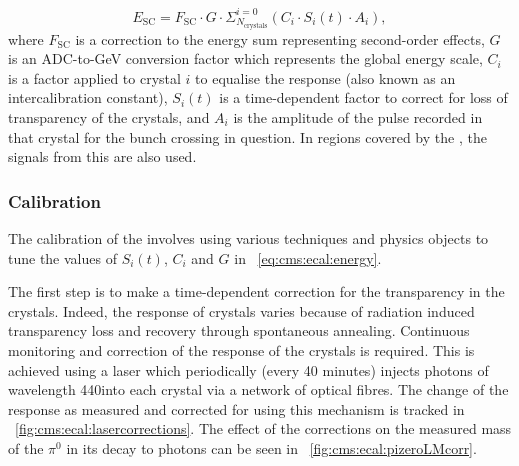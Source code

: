 \begin{equation} 
\label{eq:cms:ecal:energy}
E_{\text{SC}} = F_{\text{SC}} \cdot G \cdot \Sigma^{i=0}_{N_\text{crystals}} ( C_{i} \cdot S_{i}(t) \cdot A_{i}) ,
\end{equation}
where $F_{\text{SC}}$ is a correction to the \SC energy sum representing second-order effects, $G$ is an ADC-to-GeV conversion factor which represents the global energy scale, $C_{i}$ is a factor applied to crystal $i$ to equalise the response (also known as an intercalibration constant), $S_{i}(t)$ is a time-dependent factor to correct for loss of transparency of the crystals, and $A_{i}$ is the amplitude of the pulse recorded in that crystal for the bunch crossing in question. In regions covered by the \ES, the signals from this \subdetector are also used.~\cite{cmsEcalCalibration}


\subsubsection{Calibration}
\label{sec:cms:ecal:calibration}

The calibration of the \ECAL involves using various techniques and physics objects to tune the values of $S_{i}(t)$, $C_{i}$ and $G$ in \Eq~\ref{eq:cms:ecal:energy}. 

The first step is to make a time-dependent correction for the transparency in the crystals. Indeed, the response of \ECAL crystals varies because of radiation induced transparency loss and recovery through spontaneous annealing. Continuous monitoring and correction of the response of the crystals is required. This is achieved using a laser which periodically (every 40 minutes) injects photons of wavelength 440\nm into each crystal via a network of optical fibres. The change of the response as measured and corrected for using this mechanism is tracked in \Fig~\ref{fig:cms:ecal:lasercorrections}. The effect of the corrections on the measured mass of the $\pi^0$ in its decay to photons can be seen in \Fig~\ref{fig:cms:ecal:pizeroLMcorr}.

